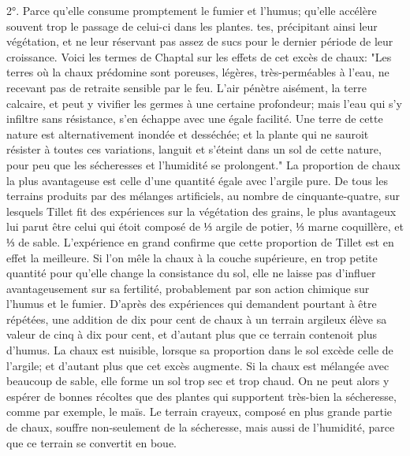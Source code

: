 2°. Parce qu'elle consume promptement le fumier et l'humus; qu'elle accélère souvent trop le passage de celui-ci dans les plantes.\setcounter{page}{122} tes, précipitant ainsi leur végétation, et ne leur réservant pas assez de sucs pour le dernier période de leur croissance. Voici les termes de Chaptal sur les effets de cet excès de chaux: "Les terres où la chaux prédomine sont poreuses, légères, très-perméables à l'eau, ne recevant pas de retraite sensible par le feu. L'air pénètre aisément, la terre calcaire, et peut y vivifier les germes à une certaine profondeur; mais l'eau qui s'y infiltre sans résistance, s'en échappe avec une égale facilité. Une terre de cette nature est alternativement inondée et desséchée; et la plante qui ne sauroit résister à toutes ces variations, languit et s'éteint dans un sol de cette nature, pour peu que les sécheresses et l'humidité se prolongent."
La proportion de chaux la plus avantageuse est celle d'une quantité égale avec l'argile pure. De tous les terrains produits par des mélanges artificiels, au nombre de cinquante-quatre, sur lesquels Tillet fit des expériences sur la végétation des grains, le plus avantageux lui parut être celui qui étoit composé de ⅓ argile de potier, ⅓ marne coquillère, et ⅓ de sable. L'expérience en grand confirme que cette proportion de Tillet est en effet la meilleure.\setcounter{page}{123} Si l'on mêle la chaux à la couche supérieure, en trop petite quantité pour qu'elle change la consistance du sol, elle ne laisse pas d'influer avantageusement sur sa fertilité, probablement par son action chimique sur l'humus et le fumier. D'après des expériences qui demandent pourtant à être répétées, une addition de dix pour cent de chaux à un terrain argileux élève sa valeur de cinq à dix pour cent, et d'autant plus que ce terrain contenoit plus d'humus.
La chaux est nuisible, lorsque sa proportion dans le sol excède celle de l'argile; et d'autant plus que cet excès augmente. Si la chaux est mélangée avec beaucoup de sable, elle forme un sol trop sec et trop chaud. On ne peut alors y espérer de bonnes récoltes que des plantes qui supportent très-bien la sécheresse, comme par exemple, le maïs. Le terrain crayeux, composé en plus grande partie de chaux, souffre non-seulement de la sécheresse, mais aussi de l'humidité, parce que ce terrain se convertit en boue.
